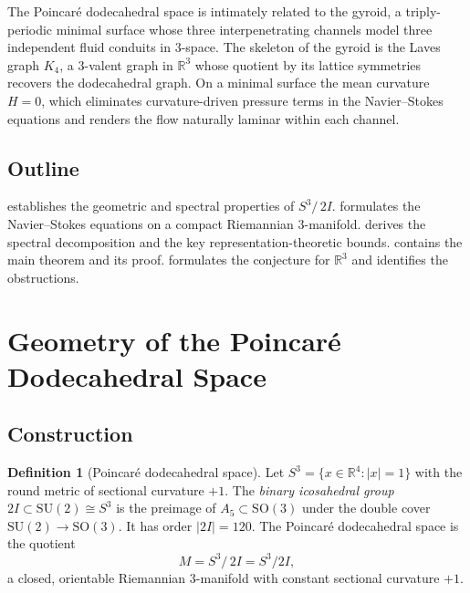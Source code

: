 \documentclass[11pt,a4paper]{article}
\theoremstyle{plain}
\theoremstyle{definition}
\newtheorem{definition}[theorem]{Definition}
\newcommand{\R}{\mathbb{R}}
\newcommand{\DS}{S^3\!/\,2I}             %
\newcommand{\BI}{2I}                      %
\newcommand{\abs}[1]{\lvert #1 \rvert}
\begin{document}
The Poincar\'{e} dodecahedral space is intimately related to the gyroid, a
triply-periodic minimal surface whose three interpenetrating channels model
three independent fluid conduits in $3$-space.  The skeleton of the gyroid is
the Laves graph $K_4$, a $3$-valent graph in $\R^3$ whose quotient by its
lattice symmetries recovers the dodecahedral graph.  On a minimal surface the
mean curvature $H = 0$, which eliminates curvature-driven pressure terms in
the Navier--Stokes equations and renders the flow naturally laminar within each
channel.

\subsection{Outline}

 establishes the geometric and spectral properties of
$\DS$.   formulates the Navier--Stokes equations on a compact
Riemannian $3$-manifold.   derives the spectral
decomposition and the key representation-theoretic bounds.
 contains the main theorem and its proof.
 formulates the conjecture for $\R^3$ and identifies the
obstructions.

\section{Geometry of the Poincar\'{e} Dodecahedral Space}\label{sec:geometry}

\subsection{Construction}

\begin{definition}[Poincar\'{e} dodecahedral space]\label{def:DS}
Let $S^3 = \{ x \in \R^4 : \abs{x} = 1 \}$ with the round metric of
sectional curvature $+1$.  The \emph{binary icosahedral group}
$\BI \subset \mathrm{SU}(2) \cong S^3$ is the preimage of $A_5 \subset
\mathrm{SO}(3)$ under the double cover $\mathrm{SU}(2) \to \mathrm{SO}(3)$.
It has order $\abs{\BI} = 120$.  The Poincar\'{e} dodecahedral space is the
quotient
\[
  M = \DS = S^3 / \BI,
\]
a closed, orientable Riemannian $3$-manifold with constant sectional curvature
$+1$.
\end{definition}
\end{document}
